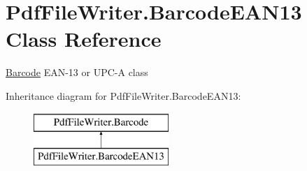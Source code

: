 \hypertarget{class_pdf_file_writer_1_1_barcode_e_a_n13}{}\section{Pdf\+File\+Writer.\+Barcode\+E\+A\+N13 Class Reference}
\label{class_pdf_file_writer_1_1_barcode_e_a_n13}


\hyperlink{class_pdf_file_writer_1_1_barcode}{Barcode} E\+A\+N-\/13 or U\+P\+C-\/A class  


Inheritance diagram for Pdf\+File\+Writer.\+Barcode\+E\+A\+N13\+:\begin{figure}[H]
\begin{center}
\leavevmode
\includegraphics[height=2.000000cm]{class_pdf_file_writer_1_1_barcode_e_a_n13}
\end{center}
\end{figure}
